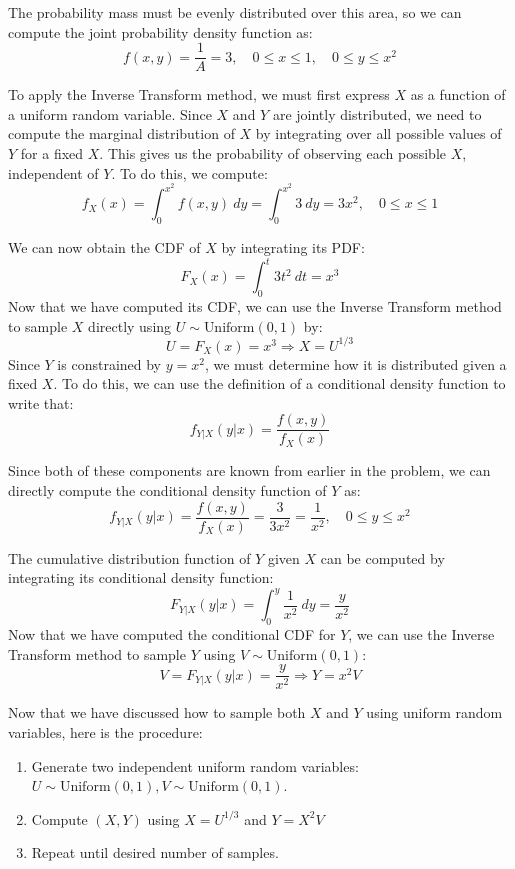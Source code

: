 \documentclass{report}
\begin{document}
The probability mass must be evenly distributed over this area, so we can compute the joint probability density function as:
\[
f(x, y)=\frac{1}{A} = 3, \quad 0 \leq x \leq 1, \quad 0 \leq y \leq x^2
\]

To apply the Inverse Transform method, we must first express $X$ as a function of a uniform random variable. Since $X$ and $Y$ are jointly distributed, we need to compute the marginal distribution of $X$ by integrating over all possible values of $Y$ for a fixed $X$. This gives us the probability of observing each possible $X$, independent of $Y$. To do this, we compute:
\[
f_X(x)=\int_{0}^{x^2} f(x,y) \ dy = \int_{0}^{x^2} 3 \ dy = 3x^2, \quad 0 \leq x \leq 1
\]

We can now obtain the CDF of $X$ by integrating its PDF:
\[
F_X(x)=\int_{0}^{t} 3t^2 \ dt = x^3
\]
Now that we have computed its CDF, we can use the Inverse Transform method to sample $X$ directly using $ U \sim \text{Uniform}(0, 1)$ by:
\[
U = F_X(x) = x^3 \Rightarrow X = U^{1/3}
\]
Since $Y$ is constrained by $y = x^2$, we must determine how it is distributed given a fixed $X$. To do this, we can use the definition of a conditional density function to write that:
\[
f_{Y|X}(y|x)=\frac{f(x,y)}{f_X(x)}
\]

Since both of these components are known from earlier in the problem, we can directly compute the conditional density function of $Y$ as:
\[
f_{Y|X}(y|x)=\frac{f(x,y)}{f_X(x)} = \frac{3}{3x^2 } = \frac{1}{x^2}, \quad 0 \leq y \leq x^2
\]

The cumulative distribution function of $Y$ given $X$ can be computed by integrating its conditional density function:
\[
F_{Y|X}(y|x)=\int_{0}^{y} \frac{1}{x^2} \ dy = \frac{y}{x^2}
\]
Now that we have computed the conditional CDF for $Y$, we can use the Inverse Transform method to sample $Y$ using $V \sim \text{Uniform}(0, 1)$:
\[
V = F_{Y|X}(y|x) = \frac{y}{x^2} \Rightarrow Y = x^2 V
\] \pagebreak

Now that we have discussed how to sample both $X$ and $Y$ using uniform random variables, here is the procedure:
\begin{enumerate}
    \item Generate two independent uniform random variables: $U \sim \text{Uniform}(0, 1), V \sim \text{Uniform}(0, 1)$.
    \item Compute $(X, Y)$ using $X = U^{1/3}$ and $Y = X^2V$
    \item Repeat until desired number of samples.
\end{enumerate}
\end{document}
